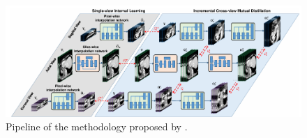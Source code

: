 \begin{figure}[!ht]
	\hspace*{-1.0in}
	\includegraphics[width=1.25\linewidth]{figures/FangArchitecture.png}
	\caption{Pipeline of the methodology proposed by \textcite{Fang2022}.}
	\label{fig:FangArchitecture}
\end{figure}

